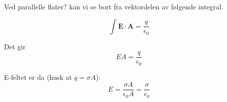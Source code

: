 Ved parallelle flater? kan vi se bort fra vektordelen
av følgende integral.

$$\int \mathbf{E} \cdot \mathbf{A}
  = \frac{q}{\epsilon_0}$$

Det gir
$$E A
  = \frac{q}{\epsilon_0}$$

E-feltet er da (husk at $q = \sigma A$):
$$E = \frac{\sigma A}{\epsilon_0 A}
    = \frac{\sigma}{\epsilon_0}$$
